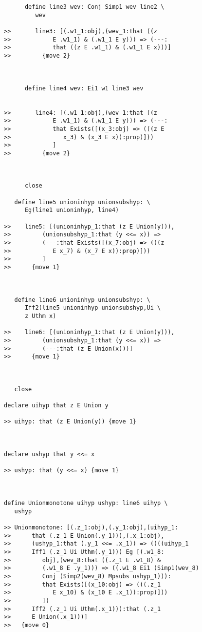 \documentclass[12pt]{article}
\begin{document}
\begin{verbatim}
      define line3 wev: Conj Simp1 wev line2 \
         wev

>>       line3: [(.w1_1:obj),(wev_1:that ((z
>>            E .w1_1) & (.w1_1 E y))) => (---:
>>            that ((z E .w1_1) & (.w1_1 E x)))]
>>         {move 2}



      define line4 wev: Ei1 w1 line3 wev


>>       line4: [(.w1_1:obj),(wev_1:that ((z
>>            E .w1_1) & (.w1_1 E y))) => (---:
>>            that Exists([(x_3:obj) => (((z E
>>               x_3) & (x_3 E x)):prop)]))
>>            ]
>>         {move 2}



      close

   define line5 unioninhyp unionsubshyp: \
      Eg(line1 unioninhyp, line4)

>>    line5: [(unioninhyp_1:that (z E Union(y))),
>>         (unionsubshyp_1:that (y <<= x)) =>
>>         (---:that Exists([(x_7:obj) => (((z
>>            E x_7) & (x_7 E x)):prop)]))
>>         ]
>>      {move 1}



   define line6 unioninhyp unionsubshyp: \
      Iff2(line5 unioninhyp unionsubshyp,Ui \
      z Uthm x)

>>    line6: [(unioninhyp_1:that (z E Union(y))),
>>         (unionsubshyp_1:that (y <<= x)) =>
>>         (---:that (z E Union(x)))]
>>      {move 1}



   close

declare uihyp that z E Union y

>> uihyp: that (z E Union(y)) {move 1}



declare ushyp that y <<= x

>> ushyp: that (y <<= x) {move 1}



define Unionmonotone uihyp ushyp: line6 uihyp \
   ushyp

>> Unionmonotone: [(.z_1:obj),(.y_1:obj),(uihyp_1:
>>      that (.z_1 E Union(.y_1))),(.x_1:obj),
>>      (ushyp_1:that (.y_1 <<= .x_1)) => ((((uihyp_1
>>      Iff1 (.z_1 Ui Uthm(.y_1))) Eg [(.w1_8:
>>         obj),(wev_8:that ((.z_1 E .w1_8) &
>>         (.w1_8 E .y_1))) => ((.w1_8 Ei1 (Simp1(wev_8)
>>         Conj (Simp2(wev_8) Mpsubs ushyp_1))):
>>         that Exists([(x_10:obj) => (((.z_1
>>            E x_10) & (x_10 E .x_1)):prop)]))
>>         ])
>>      Iff2 (.z_1 Ui Uthm(.x_1))):that (.z_1
>>      E Union(.x_1)))]
>>   {move 0}



\end{verbatim}
\end{document}
